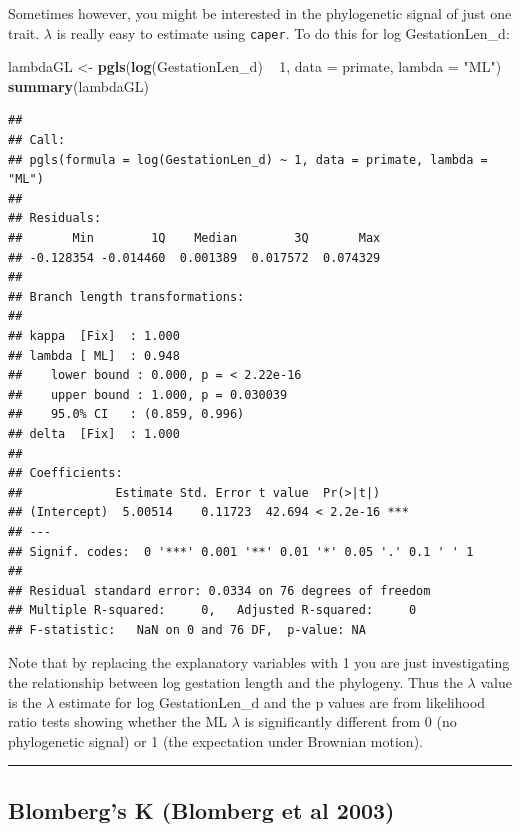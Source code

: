 \documentclass[]{book}
\newenvironment{Shaded}{\begin{snugshade}}{\end{snugshade}}
\newcommand{\KeywordTok}[1]{\textcolor[rgb]{0.13,0.29,0.53}{\textbf{{#1}}}}
\newcommand{\DataTypeTok}[1]{\textcolor[rgb]{0.13,0.29,0.53}{{#1}}}
\newcommand{\DecValTok}[1]{\textcolor[rgb]{0.00,0.00,0.81}{{#1}}}
\newcommand{\StringTok}[1]{\textcolor[rgb]{0.31,0.60,0.02}{{#1}}}
\newcommand{\NormalTok}[1]{{#1}}
\begin{document}
Sometimes however, you might be interested in the phylogenetic signal of
just one trait. \(\lambda\) is really easy to estimate using
\texttt{caper}. To do this for log GestationLen\_d:

\begin{Shaded}
\begin{Highlighting}[]
\NormalTok{lambdaGL <-}\StringTok{ }\KeywordTok{pgls}\NormalTok{(}\KeywordTok{log}\NormalTok{(GestationLen_d) ~}\StringTok{ }\DecValTok{1}\NormalTok{, }\DataTypeTok{data =} \NormalTok{primate, }\DataTypeTok{lambda =} \StringTok{"ML"}\NormalTok{)}
\KeywordTok{summary}\NormalTok{(lambdaGL)}
\end{Highlighting}
\end{Shaded}

\begin{verbatim}
## 
## Call:
## pgls(formula = log(GestationLen_d) ~ 1, data = primate, lambda = "ML")
## 
## Residuals:
##       Min        1Q    Median        3Q       Max 
## -0.128354 -0.014460  0.001389  0.017572  0.074329 
## 
## Branch length transformations:
## 
## kappa  [Fix]  : 1.000
## lambda [ ML]  : 0.948
##    lower bound : 0.000, p = < 2.22e-16
##    upper bound : 1.000, p = 0.030039
##    95.0% CI   : (0.859, 0.996)
## delta  [Fix]  : 1.000
## 
## Coefficients:
##             Estimate Std. Error t value  Pr(>|t|)    
## (Intercept)  5.00514    0.11723  42.694 < 2.2e-16 ***
## ---
## Signif. codes:  0 '***' 0.001 '**' 0.01 '*' 0.05 '.' 0.1 ' ' 1
## 
## Residual standard error: 0.0334 on 76 degrees of freedom
## Multiple R-squared:     0,   Adjusted R-squared:     0 
## F-statistic:   NaN on 0 and 76 DF,  p-value: NA
\end{verbatim}

Note that by replacing the explanatory variables with 1 you are just
investigating the relationship between log gestation length and the
phylogeny. Thus the \(\lambda\) value is the \(\lambda\) estimate for
log GestationLen\_d and the p values are from likelihood ratio tests
showing whether the ML \(\lambda\) is significantly different from 0 (no
phylogenetic signal) or 1 (the expectation under Brownian motion).

\begin{center}\rule{0.5\linewidth}{\linethickness}\end{center}

\subsection{Blomberg's K (Blomberg et al
2003)}\label{blombergs-k-blomberg-et-al-2003}
\end{document}
